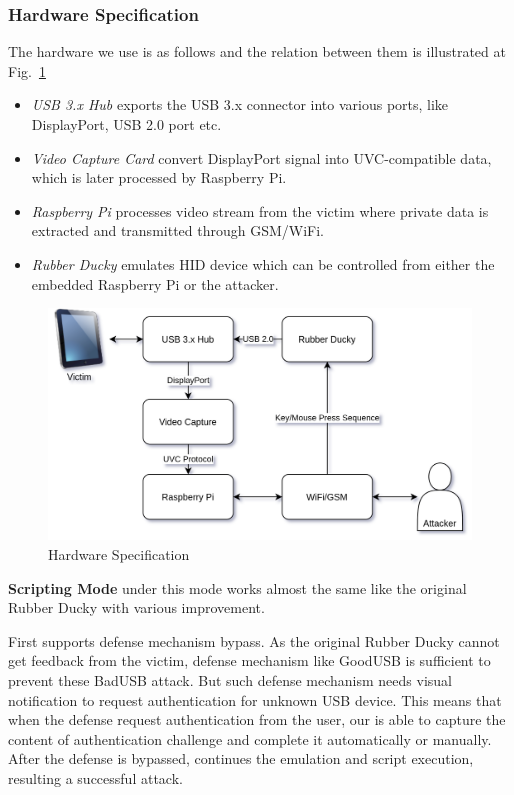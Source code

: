 \subsubsection{Hardware Specification}
The hardware we use is as follows and the relation between them is illustrated at Fig.~\ref{fig:hardware_specification}
\begin{itemize}
	\item\textit{USB 3.x Hub} exports the USB 3.x connector into various ports, like DisplayPort, USB 2.0 port etc.
	\item\textit{Video Capture Card} convert DisplayPort signal into UVC-compatible data, which is later processed by Raspberry Pi.
	\item\textit{Raspberry Pi} processes video stream from the victim where private data is extracted and transmitted through GSM/WiFi.
	\item\textit{Rubber Ducky} emulates HID device which can be controlled from either the embedded Raspberry Pi or the attacker.
\end{itemize}
\begin{figure}[hbtp]
	\includegraphics[width=\linewidth]{./Figs/hardware_specification.png}
	\caption{Hardware Specification}
	\label{fig:hardware_specification}
\end{figure}
\textbf{Scripting Mode}
\tool under this mode works almost the same like the original Rubber Ducky with various improvement.

First \tool supports defense mechanism bypass. As the original Rubber Ducky cannot get feedback from the victim, defense mechanism like GoodUSB \cite{tian2015defending} is sufficient to prevent these BadUSB attack. But such defense mechanism needs visual notification to request authentication for unknown USB device. This means that when the defense request authentication from the user, our \tool is able to capture the content of authentication challenge and complete it automatically or manually. After the defense is bypassed, \tool continues the emulation and script execution, resulting a successful attack.

